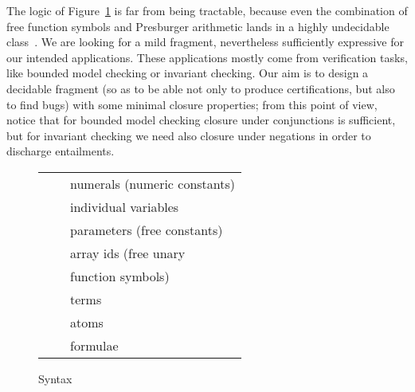 \documentclass[11pt,a4paper]{article}
\begin{document}
The logic of Figure~\ref{fig:syntax} is far from being tractable, because even
the combination of  free function symbols and Presburger arithmetic lands in a highly undecidable class~\cite{halpern}. We are looking for a mild fragment, nevertheless
sufficiently expressive  for our intended applications. These applications mostly come from verification tasks, like bounded model checking or invariant checking. 
Our aim is to design a decidable fragment (so as to be able not only to produce certifications, but also to find bugs) with some minimal closure properties; from this point of view, 
notice that for bounded model checking closure under 
conjunctions is sufficient, but for invariant checking we need also closure under negations in order to discharge entailments.



\begin{figure}[t]
\centering
{\scriptsize
\begin{tabular}{lll}
 
  && numerals (numeric constants) \\ 
 
  && individual variables \\ 
    
  && parameters (free constants)
  \\
    
   && array ids
   (free unary 
   \\&& function symbols)
  \\
  
  &
  & terms
  \\
  
  &  & atoms
  \\
  
  & &formulae
\end{tabular}
}
\caption{Syntax\label{fig:syntax}}
\end{figure}
\end{document}
